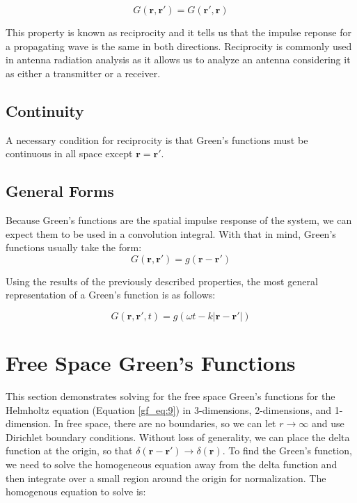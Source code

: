 \begin{equation}
G\left(\mathbf{r},\mathbf{r}' \right) = G\left(\mathbf{r}',\mathbf{r} \right)
\label{gf_eq:18c}
\end{equation}
\renewcommand{\baselinestretch}{2} \small\normalsize

This property is known as reciprocity and it tells us that the impulse reponse for a propagating wave is the same in both directions. Reciprocity is commonly used in antenna radiation analysis as it allows us to analyze an antenna considering it as either a transmitter or a receiver.

\subsection{Continuity} \label{gf_sec:continuity}
A necessary condition for reciprocity is that Green's functions must be continuous in all space except $\mathbf{r} = \mathbf{r}'$.

\subsection{General Forms}
Because Green's functions are the spatial impulse response of the system, we can expect them to be used in a convolution integral. With that in mind, Green's functions usually take the form:
\begin{equation}
G\left(\mathbf{r},\mathbf{r}' \right) = g\left( \mathbf{r} - \mathbf{r}'\right)
\label{gf_eq:18d}
\end{equation}
\renewcommand{\baselinestretch}{2} \small\normalsize

Using the results of the previously described properties, the most general representation of a Green's function is as follows:

\begin{equation}
G\left(\mathbf{r},\mathbf{r}',t \right) = g\left(\omega t - k| \mathbf{r} - \mathbf{r}' | \right)
\label{gf_eq:19b}
\end{equation}
\renewcommand{\baselinestretch}{2} \small\normalsize

\section{Free Space Green's Functions}
This section demonstrates solving for the free space Green's functions for the Helmholtz equation (Equation \ref{gf_eq:9}) in 3-dimensions, 2-dimensions, and 1-dimension. In free space, there are no boundaries, so we can let $r\rightarrow \infty$ and use Dirichlet boundary conditions. Without loss of generality, we can place the delta function at the origin, so that $\delta\left(\mathbf{r}-\mathbf{r}' \right) \rightarrow \delta \left(\mathbf{r} \right)$. To find the Green's function, we need to solve the homogeneous equation away from the delta function and then integrate over a small region around the origin for normalization. The homogenous equation to solve is:

